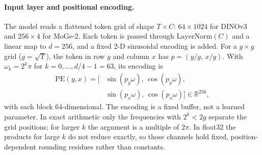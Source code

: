 \paragraph{Input layer and positional encoding.}
The model reads a flattened token grid of shape $T\times C$: $64\times1024$ for DINOv3 and $256\times4$ for MoGe-2. Each token is passed through $\mathrm{LayerNorm}(C)$ and a linear map to $d=256$, and a fixed 2-D sinusoidal encoding is added. For a $g\times g$ grid ($g=\sqrt{T}$), the token in row $y$ and column $x$ has $p=(y/g,\,x/g)$. With $\omega_k=2^k\pi$ for $k=0,\dots,d/4-1=63$, its encoding is
\begin{equation}
\begin{split}
  \mathrm{PE}(y,x)=\big[&\sin(p_y\omega),\,\cos(p_y\omega),\\
  &\sin(p_x\omega),\,\cos(p_x\omega)\big]\in\mathbb{R}^{256},
\end{split}
\end{equation}
with each block 64-dimensional. The encoding is a fixed buffer, not a learned parameter. In exact arithmetic only the frequencies with $2^k<2g$ separate the grid positions; for larger $k$ the argument is a multiple of $2\pi$. In float32 the products for large $k$ do not reduce exactly, so those channels hold fixed, position-dependent rounding residues rather than constants.

